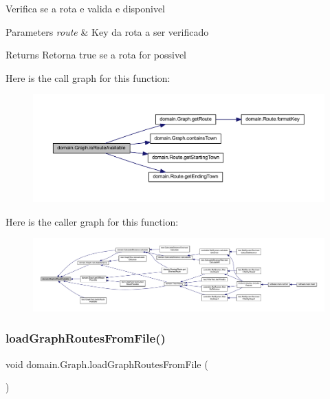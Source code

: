 Verifica se a rota e valida e disponivel


\begin{DoxyParams}{Parameters}
{\em route} & Key da rota a ser verificado \\
\hline
\end{DoxyParams}
\begin{DoxyReturn}{Returns}
Retorna true se a rota for possivel 
\end{DoxyReturn}
Here is the call graph for this function\+:\nopagebreak
\begin{figure}[H]
\begin{center}
\leavevmode
\includegraphics[width=350pt]{classdomain_1_1_graph_ab5da77fcafda90e249b7c3c049ccc3ff_cgraph}
\end{center}
\end{figure}
Here is the caller graph for this function\+:\nopagebreak
\begin{figure}[H]
\begin{center}
\leavevmode
\includegraphics[width=350pt]{classdomain_1_1_graph_ab5da77fcafda90e249b7c3c049ccc3ff_icgraph}
\end{center}
\end{figure}
\mbox{\label{classdomain_1_1_graph_ae98fbece4e39b0fb8979139f06b0a914}} 
\subsubsection{\texorpdfstring{load\+Graph\+Routes\+From\+File()}{loadGraphRoutesFromFile()}}
{\footnotesize\ttfamily void domain.\+Graph.\+load\+Graph\+Routes\+From\+File (\begin{DoxyParamCaption}{ }\end{DoxyParamCaption})}

